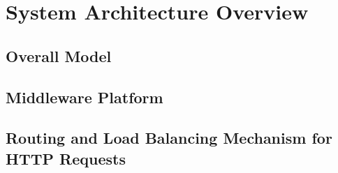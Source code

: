\clearpage
\section{System Architecture Overview}
\subsection{Overall Model}

\subsection{Middleware Platform}

\subsection{Routing and Load Balancing Mechanism for HTTP Requests}